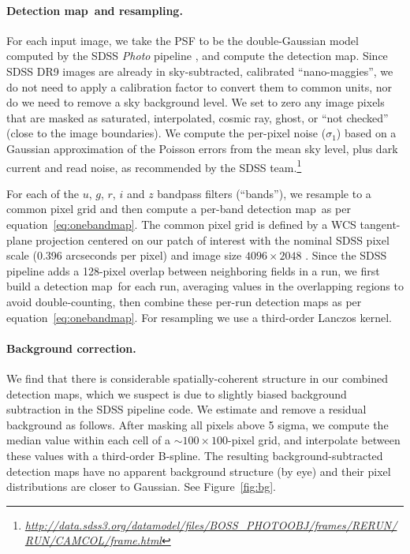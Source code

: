 \documentclass[letterpaper,preprint]{aastex62}
\newcommand{\equationname}{equation}
\newcommand{\eqnref}[1]{\mbox{\equationname~\ref{#1}}}
\newcommand{\niceurl}[1]{\mbox{\href{#1}{\textsl{#1}}}}
\newcommand{\figref}[1]{\mbox{Figure~\ref{#1}}}
\newcommand{\detmap}{detection map}
\newcommand{\Detmap}{Detection map}
\begin{document}
\paragraph{\Detmap\ and resampling.}
For each input image, we take the PSF to be the double-Gaussian model
computed by the SDSS \emph{Photo} pipeline \cite{photo}, and compute
the \detmap.  Since SDSS DR9 images are already in sky-subtracted,
calibrated ``nano-maggies'', we do not need to apply a calibration
factor to convert them to common units, nor do we need to remove a sky
background level.  We set to zero any image pixels that are masked as
saturated, interpolated, cosmic ray, ghost, or ``not checked'' (close
to the image boundaries).
We compute the per-pixel noise ($\sigma_1$) based on a Gaussian
approximation of the Poisson errors from the mean sky level, plus dark
current and read noise, as recommended by the SDSS
team.\footnote{\niceurl{http://data.sdss3.org/datamodel/files/BOSS\_PHOTOOBJ/frames/RERUN/RUN/CAMCOL/frame.html}}


For each of the $u$, $g$, $r$, $i$ and $z$ bandpass filters
(``bands''), we resample to a common pixel grid and then compute a
per-band \detmap\ as per \eqnref{eq:onebandmap}.  The common pixel
grid is defined by a WCS tangent-plane projection centered on our
patch of interest with the nominal SDSS pixel scale (0.396 arcseconds
per pixel) and image size $4096 \times 2048$ \cite{wcs}.  Since the
SDSS pipeline adds a 128-pixel overlap between neighboring fields in a
run, we first build a \detmap\ for each run, averaging values in the
overlapping regions to avoid double-counting, then combine these
per-run \detmap s as per \eqnref{eq:onebandmap}.  For resampling we
use a third-order Lanczos kernel.


\paragraph{Background correction.}
We find that there is considerable spatially-coherent structure in our
combined \detmap s, which we suspect is due to slightly biased
background subtraction in the SDSS pipeline code.  We estimate and
remove a residual background as follows.  After masking all pixels
above 5 sigma, we compute the median value within each cell of a $\sim
100 \times 100$-pixel grid, and interpolate between these values with
a third-order B-spline.  The resulting background-subtracted \detmap s
have no apparent background structure (by eye) and their pixel
distributions are closer to Gaussian.  See \figref{fig:bg}.
\end{document}
